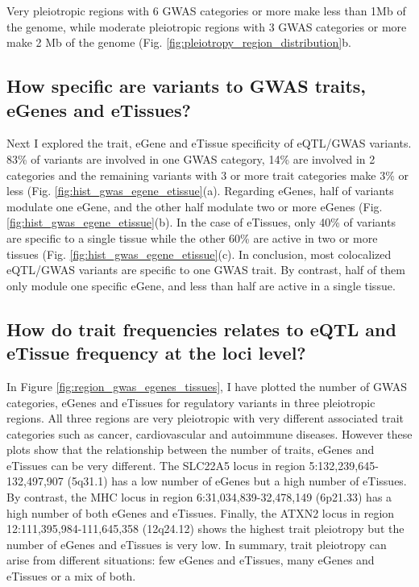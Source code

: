 Very pleiotropic regions with 6 GWAS categories or more make less than 1Mb of the genome, while moderate pleiotropic regions with 3 GWAS categories or more make 2 Mb of the genome (Fig. \ref{fig:pleiotropy_region_distribution}b.

\subsection*{How specific are variants to GWAS traits, eGenes and eTissues?}

Next I explored the trait, eGene and eTissue specificity of eQTL/GWAS variants.
%
83\% of variants are involved in one GWAS category, 14\% are involved in 2 categories and the remaining variants with 3 or more trait categories make 3\% or less (Fig. \ref{fig:hist_gwas_egene_etissue}(a).
%
Regarding eGenes, half of variants modulate one eGene, and the other half modulate two or more eGenes (Fig. \ref{fig:hist_gwas_egene_etissue}(b).
%
In the case of eTissues, only 40\% of variants are specific to a single tissue while the other 60\% are active in two or more tissues (Fig. \ref{fig:hist_gwas_egene_etissue}(c).
%
In conclusion, most colocalized eQTL/GWAS variants are specific to one GWAS trait. By contrast, half of them only module one specific eGene, and less than half are active in a single tissue.

\subsection*{How do trait frequencies relates to eQTL and eTissue frequency at the loci level?}

In Figure \ref{fig:region_gwas_egenes_tissues}, I have plotted the number of GWAS categories, eGenes and eTissues for regulatory variants in three pleiotropic regions.
%
All three regions are very pleiotropic with very different associated trait categories such as cancer, cardiovascular and autoimmune diseases.
%
However these plots show that the relationship between the number of traits, eGenes and eTissues can be very different.
%
The SLC22A5 locus in region 5:132,239,645-132,497,907 (5q31.1) has a low number of eGenes but a high number of eTissues.
%
By contrast, the MHC locus in region 6:31,034,839-32,478,149 (6p21.33) has a high number of both eGenes and eTissues.
%
Finally, the ATXN2 locus in region 12:111,395,984-111,645,358 (12q24.12) shows the highest trait pleiotropy but the number of eGenes and eTissues is very low.
%
In summary, trait pleiotropy can arise from different situations: few eGenes and eTissues, many eGenes and eTissues or a mix of both.

